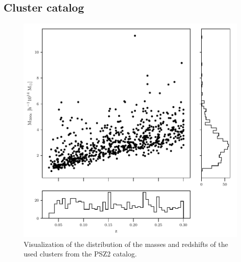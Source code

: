 \documentclass[iop, apjl, twocolappendix, numberedappendix]{emulateapj}
\begin{document}
\subsection{Cluster catalog}
\label{sec:clusters}

\begin{figure}
    \includegraphics[scale=0.55]{Planck_summary.pdf}
\caption{Visualization of the distribution of the masses and redshifts of the used
clusters from the PSZ2 catalog.}
   \label{fig:placnk_summary}
\end{figure}
\end{document}
